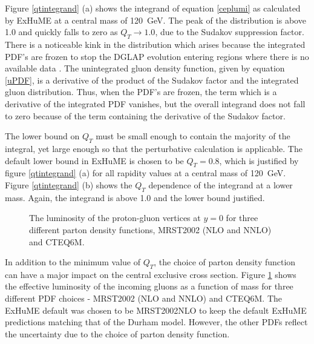 Figure \ref{qtintegrand} (a) shows the integrand of equation \ref{ceplumi} as calculated by ExHuME at a central mass of 120~GeV. The peak of the distribution is above 1.0 and quickly falls to zero as $Q_T \rightarrow 1.0$, due to the Sudakov suppression factor. There is a noticeable kink in the distribution which arises because the integrated PDF's are frozen to stop the DGLAP evolution entering regions where there is no available data \cite{Whalley:2005nh}. The unintegrated gluon density function, given by equation \ref{uPDF}, is a derivative of the product of the Sudakov factor and the integrated gluon distribution. Thus, when the PDF's are frozen, the term which is a derivative of the integrated PDF vanishes, but the overall integrand does not fall to zero because of the term containing the derivative of the Sudakov factor.

The lower bound on $Q_T$ must be small enough to contain the majority of the integral, yet large enough so that the perturbative calculation is applicable. 
The default lower bound in ExHuME is chosen to be $Q_{T} = 0.8$, which is justified by figure \ref{qtintegrand} (a) for all rapidity values at a central mass of 120~GeV. Figure \ref{qtintegrand} (b) shows the $Q_T$ dependence of the integrand at a  lower mass. Again, the integrand is above 1.0 and the lower bound justified.

\begin{figure} 
\centering
\caption[The luminosity of the incoming gluons as calculated by ExHuME]{The luminosity of the proton-gluon vertices at $y=0$ for three different parton density functions, MRST2002 (NLO and NNLO) and CTEQ6M. \label{exhumelumi}}
\end{figure}

In addition to the minimum value of $Q_T$, the choice of parton density function can have a major impact on the central exclusive cross section. Figure \ref{exhumelumi} shows the effective luminosity of the incoming gluons as a function of mass for three different PDF choices - MRST2002 (NLO and NNLO) and CTEQ6M. 
The ExHuME default was chosen to be MRST2002NLO to keep the default ExHuME predictions matching that of the Durham model. However, the other PDFs reflect the uncertainty due to the choice of parton density function.

